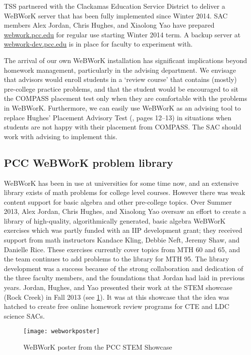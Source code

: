 TSS partnered with the Clackamas Education Service District to deliver a WeBWorK server that has been fully implemented since Winter 2014.
SAC members Alex Jordan, Chris Hughes, and Xiaolong Yao have prepared \href{http://webwork.
	pcc.edu}{webwork.pcc.edu} for regular use starting Winter
2014 term.
A backup server at \href{http://webwork-dev.
	pcc.edu}{webwork-dev.pcc.edu} is in place for faculty
to experiment with.

The arrival of our own WeBWorK installation has significant implications beyond homework management, particularly in the advising department.
We envisage that advisors would enroll students in a `review course' that contains (mostly) pre-college practice problems, and that the student would be encouraged to sit the COMPASS placement test only when they are comfortable with the problems in WeBWorK.
Furthermore, we can easily use WeBWorK as an advising tool to replace Hughes' Placement Advisory Test (\cite{mathprogramreview2003}, pages 12--13) in situations when students are not happy with their placement from COMPASS.
The SAC should work with advising to implement this.

\subsection{PCC WeBWorK problem library}
WeBWorK has been in use at universities for some time now, and an extensive library exists of math problems for college level courses.
However there was weak content support for basic algebra and other pre-college topics.
Over Summer 2013, Alex Jordan, Chris Hughes, and Xiaolong Yao oversaw an effort to create a library of high-quality, algorithmically generated, basic algebra WeBWorK exercises which was partly funded with an IIP development grant; they received support from math instructors Kandace Kling, Debbie Neft, Jeremy Shaw, and Danielle Rice.
These exercises currently cover topics from MTH 60 and 65, and the team continues to add problems to the library for MTH 95.
The library development was a success because of the strong collaboration and dedication of the three faculty members, and the foundations that Jordan had laid in previous years.
Jordan, Hughes, and Yao presented their work at the STEM showcase (Rock Creek) in Fall 2013 (see \cref{webworkposter}).
It was at this showcase that the idea was hatched to create free online homework review programs for CTE and LDC science SACs.

\begin{figure}[!htb]
	\centering
	\texttt{[image: webworkposter]}
	\caption{WeBWorK poster from the PCC STEM Showcase}\label{webworkposter}
\end{figure}

